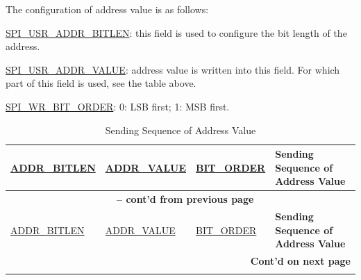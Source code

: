 \documentclass[main\_\_EN.tex]{subfiles}
\begin{document}
The configuration of address value is as follows:

\begin{ThreePartTable}

\begin{TableNotes}
    \item[1] \hyperref[fielddesc:SPIUSRADDRBITLEN]{SPI\_USR\_ADDR\_BITLEN}: this field is used to configure the bit length of the address.
    \item[2] \hyperref[fielddesc:SPIUSRADDRVALUE]{SPI\_USR\_ADDR\_VALUE}: address value is written into this field. For which part of this field is used, see the table above.
    \item[3] \hyperref[fielddesc:SPIWRBITORDER]{SPI\_WR\_BIT\_ORDER}: 0: LSB first; 1: MSB first.
\end{TableNotes}
\begin{longtable}[c]{|l|l|l|p{8.0cm}|}
\caption{Sending Sequence of Address Value}
\label{tab:spi-send-sequence-address-value}\\\hline
    \rowcolor{lightgray}
    \hyperref[fielddesc:SPIUSRADDRBITLEN]{ADDR\_BITLEN\tnote{1}}& \hyperref[fielddesc:SPIUSRADDRVALUE]{ADDR\_VALUE\tnote{2}} & \hyperref[fielddesc:SPIWRBITORDER]{BIT\_ORDER\tnote{3}} & \textbf{Sending Sequence of Address Value} \\\hline
    \endfirsthead

    \multicolumn{4}{c}{\bfseries \tablename\ \thetable{} -- cont'd from previous page}\\\hline

    \rowcolor{lightgray}
    \hyperref[fielddesc:SPIUSRADDRBITLEN]{ADDR\_BITLEN\tnote{1}}& \hyperref[fielddesc:SPIUSRADDRVALUE]{ADDR\_VALUE\tnote{2}} & \hyperref[fielddesc:SPIWRBITORDER]{BIT\_ORDER\tnote{3}} & \textbf{Sending Sequence of Address Value} \\\hline
    \endhead

    \multicolumn{4}{r}{\textbf{Cont'd on next page}} \\
    \endfoot
    \endlastfoot


\end{longtable}
\end{ThreePartTable}
\end{document}
